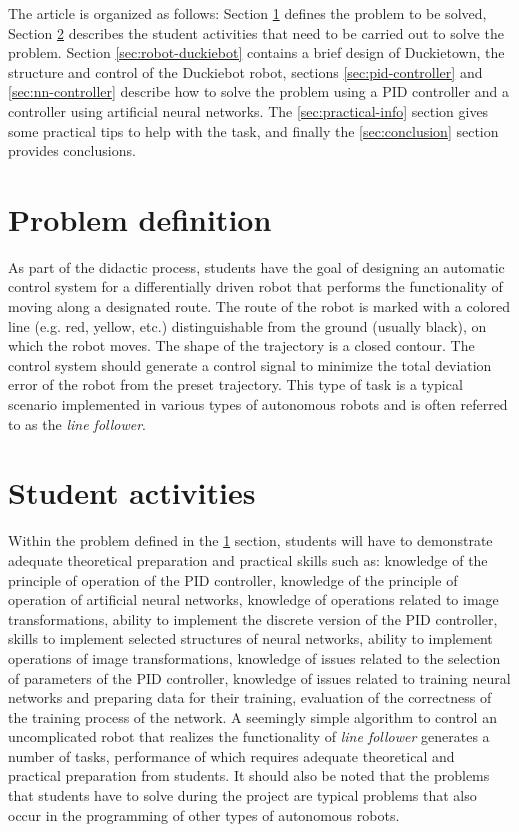 \documentclass[conference]{IEEEtran}
\begin{document}
The article is organized as follows: Section \ref{sec:problem-definition} defines the problem to be solved, Section \ref{sec:student-activity} describes the student activities that need to be carried out to solve the problem. Section \ref{sec:robot-duckiebot} contains a brief design of Duckietown, the structure and control of the Duckiebot robot, sections \ref{sec:pid-controller} and \ref{sec:nn-controller} describe how to solve the problem using a PID controller and a controller using artificial neural networks. The \ref{sec:practical-info} section gives some practical tips to help with the task, and finally the \ref{sec:conclusion} section provides conclusions.


\section{Problem definition}\label{sec:problem-definition}
As part of the didactic process, students have the goal of designing an automatic control system for a differentially driven robot that performs the functionality of moving along a designated route. The route of the robot is marked with a colored line (e.g. red, yellow, etc.) distinguishable from the ground (usually black), on which the robot moves. The shape of the trajectory is a closed contour. The control system should generate a control signal to minimize the total deviation error of the robot from the preset trajectory. This type of task is a typical scenario implemented in various types of autonomous robots and is often referred to as the \emph{line follower}.


\section{Student activities}\label{sec:student-activity}
Within the problem defined in the \ref{sec:problem-definition} section, students will have to demonstrate adequate theoretical preparation and practical skills such as: knowledge of the principle of operation of the PID controller, knowledge of the principle of operation of artificial neural networks, knowledge of operations related to image transformations, ability to implement the discrete version of the PID controller, skills to implement selected structures of neural networks, ability to implement operations of image transformations, knowledge of issues related to the selection of parameters of the PID controller, knowledge of issues related to training neural networks and preparing data for their training, evaluation of the correctness of the training process of the network. A seemingly simple algorithm to control an uncomplicated robot that realizes the functionality of \emph{line follower} generates a number of tasks, performance of which requires adequate theoretical and practical preparation from students. It should also be noted that the problems that students have to solve during the project are typical problems that also occur in the programming of other types of autonomous robots.
\end{document}
